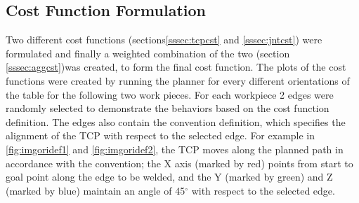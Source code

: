 \subsection{Cost Function Formulation}
\label{ssec:cst}
Two different cost functions (sections\ref{sssec:tcpcst} and \ref{sssec:jntcst}) were formulated and finally a weighted combination of the two (section \ref{sssec:aggcst})was created, to form the final cost function. The plots of the cost functions were created by running the planner for every different orientations of the table for the following two work pieces. For each workpiece 2 edges were randomly selected to demonstrate the behaviors based on the cost function definition. The edges also contain the convention definition, which specifies the alignment of the TCP with respect to the selected edge. For example in \ref{fig:imgoridef1} and \ref{fig:imgoridef2}, the TCP moves along the planned path in accordance with the convention; the X axis (marked by red) points from start to goal point along the edge to be welded, and the Y (marked by green) and Z (marked by blue) maintain an angle of 45$^{\circ}$ with respect to the selected edge. \\
